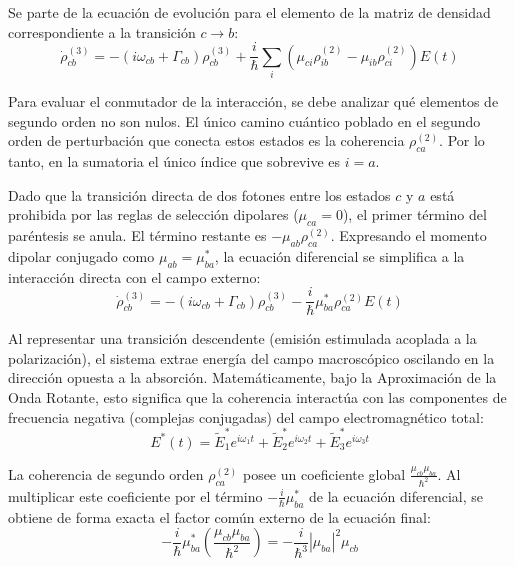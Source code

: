 \documentclass[12pt,a4paper]{article}
\begin{document}
Se parte de la ecuación de evolución para el elemento de la matriz de densidad correspondiente a la transición $c \to b$:
\begin{equation}
\dot{\rho}_{cb}^{(3)} = -(i\omega_{cb} + \Gamma_{cb})\rho_{cb}^{(3)} + \frac{i}{\hbar} \sum_i (\mu_{ci}\rho_{ib}^{(2)} - \mu_{ib}\rho_{ci}^{(2)})E(t)
\end{equation}

Para evaluar el conmutador de la interacción, se debe analizar qué elementos de segundo orden no son nulos. El único camino cuántico poblado en el segundo orden de perturbación que conecta estos estados es la coherencia $\rho_{ca}^{(2)}$. Por lo tanto, en la sumatoria el único índice que sobrevive es $i=a$.

Dado que la transición directa de dos fotones entre los estados $c$ y $a$ está prohibida por las reglas de selección dipolares ($\mu_{ca} = 0$), el primer término del paréntesis se anula. El término restante es $-\mu_{ab}\rho_{ca}^{(2)}$. Expresando el momento dipolar conjugado como $\mu_{ab} = \mu_{ba}^*$, la ecuación diferencial se simplifica a la interacción directa con el campo externo:
\begin{equation}
\dot{\rho}_{cb}^{(3)} = -(i\omega_{cb} + \Gamma_{cb})\rho_{cb}^{(3)} - \frac{i}{\hbar} \mu_{ba}^* \rho_{ca}^{(2)} E(t)
\end{equation}



Al representar una transición descendente (emisión estimulada acoplada a la polarización), el sistema extrae energía del campo macroscópico oscilando en la dirección opuesta a la absorción. Matemáticamente, bajo la Aproximación de la Onda Rotante, esto significa que la coherencia interactúa con las componentes de frecuencia negativa (complejas conjugadas) del campo electromagnético total:
\begin{equation}
E^*(t) = \tilde{E}_1^* e^{i\omega_1 t} + \tilde{E}_2^* e^{i\omega_2 t} + \tilde{E}_3^* e^{i\omega_3 t}
\end{equation}

La coherencia de segundo orden $\rho_{ca}^{(2)}$ posee un coeficiente global $\frac{\mu_{cb}\mu_{ba}}{\hbar^2}$. Al multiplicar este coeficiente por el término $-\frac{i}{\hbar}\mu_{ba}^*$ de la ecuación diferencial, se obtiene de forma exacta el factor común externo de la ecuación final:
\begin{equation}
-\frac{i}{\hbar} \mu_{ba}^* \left( \frac{\mu_{cb}\mu_{ba}}{\hbar^2} \right) = -\frac{i}{\hbar^3} |\mu_{ba}|^2 \mu_{cb}
\end{equation}
\end{document}
